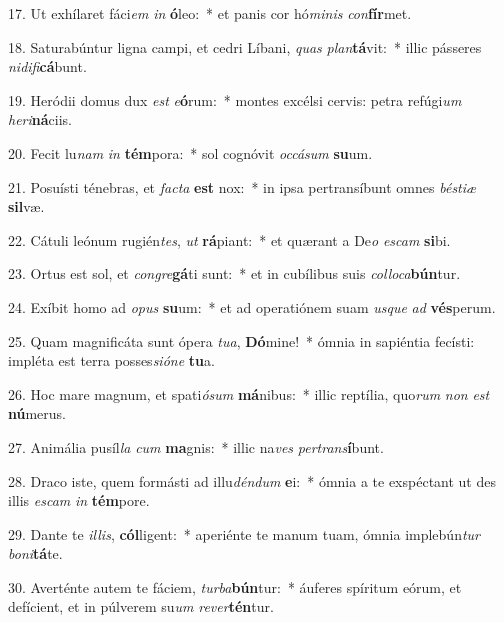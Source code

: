 17. Ut exhílaret fáci\textit{em} \textit{in} \textbf{ó}leo:~*  et panis cor hó\textit{mi}\textit{nis} \textit{con}\textbf{fír}met.\

18. Saturabúntur ligna campi, et cedri Líbani, \textit{quas} \textit{plan}\textbf{tá}vit:~*  illic pásseres \textit{ni}\textit{di}\textit{fi}\textbf{cá}bunt.\

19. Heródii domus dux \textit{est} \textit{e}\textbf{ó}rum:~*  montes excélsi cervis: petra refúgi\textit{um} \textit{he}\textit{ri}\textbf{ná}ciis.\

20. Fecit lu\textit{nam} \textit{in} \textbf{tém}pora:~*  sol cognóvit \textit{oc}\textit{cá}\textit{sum} \textbf{su}um.\

21. Posuísti ténebras, et \textit{fac}\textit{ta} \textbf{est} nox:~*  in ipsa pertransíbunt omnes \textit{bés}\textit{ti}\textit{æ} \textbf{sil}væ.\

22. Cátuli leónum rugién\textit{tes}, \textit{ut} \textbf{rá}piant:~*  et quærant a De\textit{o} \textit{es}\textit{cam} \textbf{si}bi.\

23. Ortus est sol, et \textit{con}\textit{gre}\textbf{gá}ti sunt:~*  et in cubílibus suis \textit{col}\textit{lo}\textit{ca}\textbf{bún}tur.\

24. Exíbit homo ad \textit{o}\textit{pus} \textbf{su}um:~*  et ad operatiónem suam \textit{us}\textit{que} \textit{ad} \textbf{vés}perum.\

25. Quam magnificáta sunt ópera \textit{tu}\textit{a}, \textbf{Dó}mine!~*  ómnia in sapiéntia fecísti: impléta est terra posses\textit{si}\textit{ó}\textit{ne} \textbf{tu}a.\

26. Hoc mare magnum, et spati\textit{ó}\textit{sum} \textbf{má}nibus:~*  illic reptília, quo\textit{rum} \textit{non} \textit{est} \textbf{nú}merus.\

27. Animália pusíl\textit{la} \textit{cum} \textbf{ma}gnis:~*  illic na\textit{ves} \textit{per}\textit{trans}\textbf{í}bunt.\

28. Draco iste, quem formásti ad illu\textit{dén}\textit{dum} \textbf{e}i:~*  ómnia a te exspéctant ut des illis \textit{es}\textit{cam} \textit{in} \textbf{tém}pore.\

29. Dante te \textit{il}\textit{lis}, \textbf{cól}ligent:~*  aperiénte te manum tuam, ómnia implebún\textit{tur} \textit{bo}\textit{ni}\textbf{tá}te.\

30. Averténte autem te fáciem, \textit{tur}\textit{ba}\textbf{bún}tur:~*  áuferes spíritum eórum, et defícient, et in púlverem su\textit{um} \textit{re}\textit{ver}\textbf{tén}tur.\

